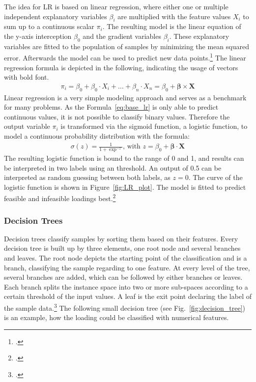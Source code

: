 The idea for \gls{LR} is based on linear regression, where either one or multiple independent explanatory
variables $\beta_i$ are multiplied with the feature values $X_i$ to sum up to a continuous scalar $\pi_i$.
The resulting model is the linear equation of the y-axis interception $\beta_0$
and the gradient variables $\beta_i$.
These explanatory variables are fitted to the population of samples by minimizing the mean squared
error. Afterwards the model can be used to predict new data points.\footcite[cf.][pp. 6-7]{nasteski_overview_2017}
The linear regression formula is depicted in the following, indicating the usage of vectors with bold font.
\begin{align}
    \pi_i=\beta_0+\beta_0 \cdot X_i+\dots+\beta_n \cdot X_n = \beta_0 + \bm{\beta} \times \bm{X}
    \label{eq:base_lr}
\end{align}
Linear regression is a very simple modeling approach and serves as a benchmark for many problems. As the Formula~\ref{eq:base_lr} is only able to predict continuous
values, it is not possible to classify binary values. Therefore the output variable $\pi_i$ is transformed via the sigmoid function, a logistic function,
to model a continuous probability distribution with the formula:
\begin{align}
    \sigma(z)=\frac{1}{1+\exp^{-z}},\, \text{with } z = \beta_0 + \bm{\beta} \cdot \bm{X}
    \label{eq:logistic_func}
\end{align}
The resulting logistic function is bound to the range of 0 and 1, and results can be interpreted
in two labels using an threshold. An output of 0.5 can be interpreted as random
guessing between both labels, as $z=0$. The curve of the logistic function is shown in Figure~\ref{fig:LR_plot}.
The model is fitted to predict feasible and infeasible loadings best.\footcite[cf.][]{kirasich_random_2018}



\subsubsection{Decision Trees}
Decision trees classify samples by sorting them based on their features. Every decision tree
is built up by three elements, one root node and several branches and leaves. The root node
depicts the starting point of the classification and is a branch, classifying the sample
regarding to one feature. At every level of the tree, several branches are added, which can be followed
by either branches or leaves. Each branch splits the instance space into two or more sub-spaces
according to a certain threshold of the input values. A leaf is the exit point declaring
the label of the sample data.\footcite[cf.][p.5-6]{nasteski_overview_2017}
The following small decision tree (see Fig.~\ref{fig:decision_tree}) is an example,
how the loading could be classified with numerical features.

